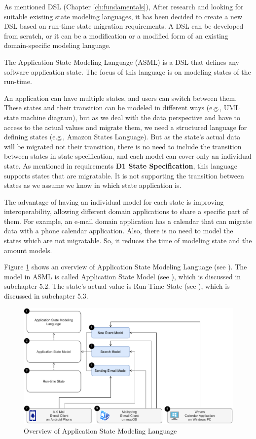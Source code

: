 As mentioned DSL (Chapter \ref{ch:fundamentals}), After research and looking for suitable existing state modeling languages, it has been decided to create a new DSL based on run-time state migration requirements.
A DSL can be developed from scratch, or it can be a modification or a modified form of an existing domain-specific modeling language.

The Application State Modeling Language (ASML) is a DSL that defines any software application state.
The focus of this language is on modeling states of the run-time.

An application can have multiple states, and users can switch between them.
These states and their transition can be modeled in different ways (e.g., UML state machine diagram), but as we deal with the data perspective and have to access to the actual values and migrate them, we need a structured language for defining states (e.g., Amazon States Language). But as the state’s actual data will be migrated not their transition, there is no need to include the transition between states in state specification, and each model can cover only an individual state. As mentioned in requirements \textbf{D1 State Specification}, this language supports states that are migratable.
It is not supporting the transition between states as we assume we know in which state application is. 

The advantage of having an individual model for each state is improving interoperability, allowing different domain applications to share a specific part of them.
For example, an e-mail domain application has a calendar that can migrate data with a phone calendar application.
Also, there is no need to model the states which are not migratable. So, it reduces the time of modeling state and the amount models. 

Figure \ref{fig:asml-overview} shows an overview of Application State Modeling Language (see \fcircone). The model in ASML is called Application State Model (see \fcirctwo), which is discussed in subchapter 5.2. The state’s actual value is Run-Time State (see \fcircthree), which is discussed in subchapter 5.3.

\FloatBarrier
\begin{figure}
    \includegraphics[scale=0.75]{../figures/asml-overview}
    \centering
    \caption{Overview of Application State Modeling Language}
    \label{fig:asml-overview}
\end{figure}
\FloatBarrier

